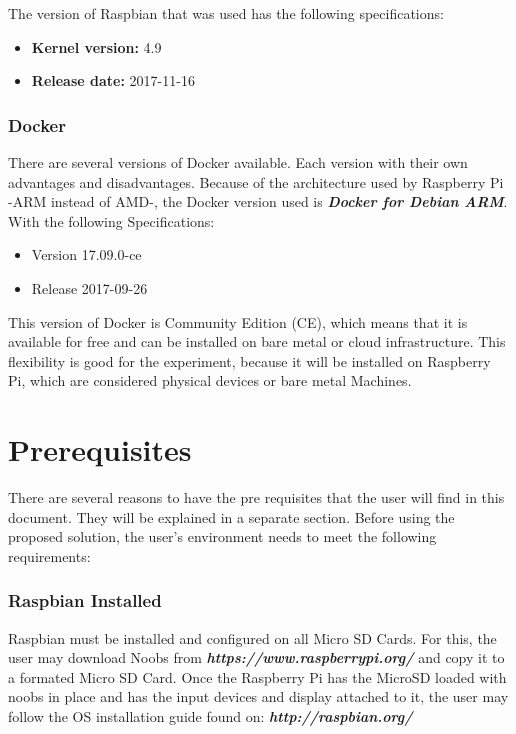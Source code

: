 	The version of Raspbian that was used has the following specifications:
	
	\begin{itemize}
	\item 	\textbf{Kernel version:} 4.9
	\item 	\textbf{Release date:} 2017-11-16
	\end{itemize}
	
	\subsubsection{Docker}

	There are several versions of Docker available. Each version with their own advantages and disadvantages. Because of the architecture used by Raspberry Pi -ARM instead of AMD-, the Docker version used is 	\textbf{\textit{Docker for Debian ARM}}. With the following Specifications:
	
	\begin{itemize}
	\item Version 17.09.0-ce
	\item Release 2017-09-26
	\end{itemize}
	
	This version of Docker is Community Edition (CE), which means that it is available for free and can be installed on bare metal or cloud infrastructure. This flexibility is good for the experiment, because it will be installed on Raspberry Pi, which are considered physical devices or bare metal Machines.
	\cite{dockerdoc2017}
	
	\section{Prerequisites}
	
	There are several reasons to have the pre requisites that the user will find in this document. They will be explained in a separate section. Before using the proposed solution, the user’s environment needs to meet the following requirements:
	
	\subsubsection{Raspbian Installed}
	Raspbian must be installed and configured on all Micro SD Cards.
	For this, the user may download Noobs from 	\textbf{\textit{https://www.raspberrypi.org/}} and copy it to a formated Micro SD Card.
	Once the Raspberry Pi has the MicroSD loaded with noobs in place and has the input devices and display attached to it, the user may follow the OS installation guide found on: \textbf{\textit{http://raspbian.org/}}
	
